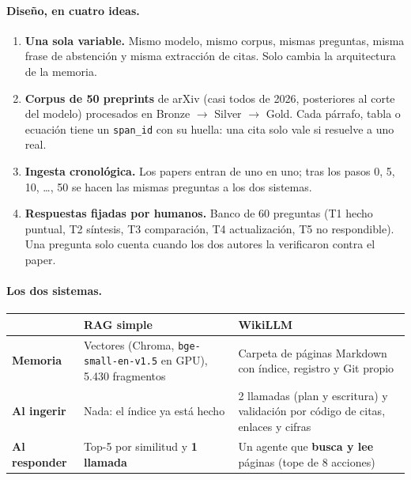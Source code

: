 \documentclass[11pt,a4paper]{article}
\newcommand{\cod}[1]{\texttt{\small #1}}
\begin{document}
\paragraph{Diseño, en cuatro ideas.}
\begin{enumerate}
  \item \textbf{Una sola variable.} Mismo modelo, mismo corpus, mismas preguntas, misma frase de
        abstención y misma extracción de citas. Solo cambia la arquitectura de la memoria.
  \item \textbf{Corpus de 50 preprints} de arXiv (casi todos de 2026, posteriores al corte del
        modelo) procesados en Bronze $\rightarrow$ Silver $\rightarrow$ Gold. Cada párrafo, tabla o
        ecuación tiene un \cod{span\_id} con su huella: una cita solo vale si resuelve a uno real.
  \item \textbf{Ingesta cronológica.} Los papers entran de uno en uno; tras los pasos
        0, 5, 10, \dots, 50 se hacen las mismas preguntas a los dos sistemas.
  \item \textbf{Respuestas fijadas por humanos.} Banco de 60 preguntas (T1 hecho puntual, T2
        síntesis, T3 comparación, T4 actualización, T5 no respondible). Una pregunta solo cuenta
        cuando los dos autores la verificaron contra el paper.
\end{enumerate}

\paragraph{Los dos sistemas.}
\begin{center}
\begin{tabularx}{\linewidth}{@{}>{\bfseries}l X X@{}}
\toprule
 & \textcolor{rag}{RAG simple} & \textcolor{wiki}{WikiLLM} \\
\midrule
Memoria & Vectores (Chroma, \cod{bge-small-en-v1.5} en GPU), 5.430 fragmentos &
          Carpeta de páginas Markdown con índice, registro y Git propio \\
Al ingerir & Nada: el índice ya está hecho & 2 llamadas (plan y escritura) y validación por
          código de citas, enlaces y cifras \\
Al responder & Top-5 por similitud y \textbf{1 llamada} & Un agente que \textbf{busca y lee}
          páginas (tope de 8 acciones) \\
\bottomrule
\end{tabularx}
\end{center}

\end{document}

